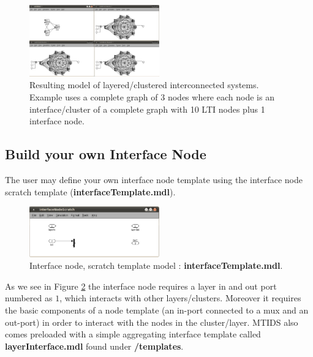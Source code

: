 \documentclass[a4paper,twoside, openright,12pt]{report}
\begin{document}
\begin{figure}[htb]
\centering
\includegraphics[width=0.5\textwidth]{pics/screenLayers.eps}
\caption[MTIDS model of layered/clustered interconnected systems]{Resulting model of layered/clustered interconnected systems. Example uses a complete graph of 3 nodes where each node is an interface/cluster of a complete graph with 10 LTI nodes plus 1 interface node.}
\label{layersFig}
\end{figure}




\subsection{Build your own Interface Node}

The user may define your own interface node template using the interface node scratch template (\textbf{interfaceTemplate.mdl}). \\

\begin{figure}[htb]
\centering
\includegraphics[width=0.5\textwidth]{pics/interfaceTemplate.eps}
\caption[MTIDS interface node scratch template]{Interface node, scratch template model : \textbf{interfaceTemplate.mdl}.}
\label{interfaceFig}
\end{figure}
 
As we see in Figure \ref{interfaceFig} the interface node requires a layer in and out port numbered as $1$, which interacts with other layers/clusters. 
Moreover it requires the basic components of a node template (an in-port connected to a mux and an out-port) in order to interact with the nodes in the cluster/layer.
MTIDS also comes preloaded with a simple aggregating interface template called \textbf{layerInterface.mdl} found under \textbf{/templates}.
 
\end{document}
